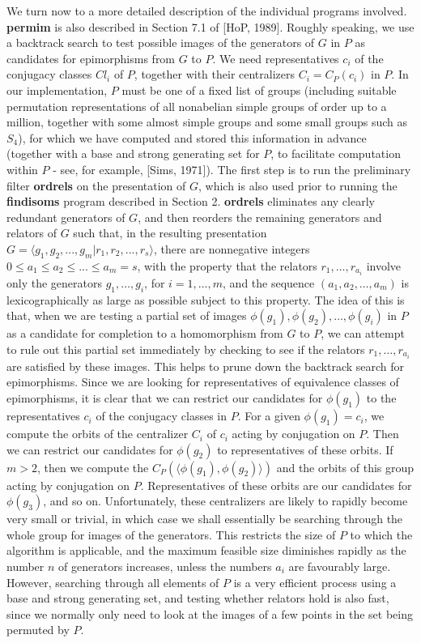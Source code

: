We turn now to a more detailed description of the individual programs
involved. {\bf permim} is also described in Section 7.1 of [HoP, 1989].
Roughly speaking, we use a backtrack search to test possible images of
the generators of $G$ in $P$ as candidates for epimorphisms from $G$ to $P$.
We need representatives  $c_i$ of the conjugacy classes $Cl_i$ of $P$,
together with their centralizers  $C_i = C_P(c_i)$ in $P$. In our
implementation, $P$ must be one of a fixed list of groups (including suitable
permutation representations of all nonabelian simple groups of order up to a
million, together with some almost simple groups and some small groups
such as $S_4$), for which we have computed
and stored this information in advance  (together with a base and strong
generating set  for $P$,  to facilitate computation within $P$ -
see, for example, [Sims, 1971]).
The first step is to run the preliminary filter {\bf ordrels} on the 
presentation
of $G$, which is also used prior to running the {\bf findisoms} program
described in Section 2.
{\bf ordrels} eliminates any clearly redundant generators of $G$, and then
reorders the remaining generators and relators of $G$ such that, in the
resulting presentation
$G = \langle g_1, g_2, ..., g_m | r_1, r_2, ..., r_s \rangle$,
there are nonnegative integers $0 \leq a_1 \leq a_2 \leq ... \leq a_m = s$,
with the property that the relators $r_1, \ldots , r_{a_i}$  involve only the
generators $g_1, \ldots , g_i$,  for $i = 1,\ldots ,m$,  and the sequence
$(a_1,a_2,\ldots ,a_m)$ is lexicographically as large as possible subject to
this property. The idea of this is that, when we are testing a partial
set of images  $\phi(g_1), \phi(g_2), \ldots , \phi(g_i)$ in $P$ as a candidate
for completion to a homomorphism from $G$ to $P$, we can attempt to rule out
this partial set immediately by checking to see if the relators
$r_1, \ldots , r_{a_i}$ are satisfied by these images. This helps to prune down
the backtrack search for epimorphisms. Since we are looking for representatives
of equivalence classes of epimorphisms, it is clear that we can restrict
our candidates for $\phi(g_1)$ to the representatives $c_i$ of the conjugacy
classes in $P$. For a given $\phi(g_1) = c_i$, we compute the orbits of the
centralizer  $C_i$ of $c_i$ acting by conjugation on $P$. Then we can restrict
our candidates for $\phi(g_2)$ to representatives of these orbits. If $m > 2$,
then we compute the  $C_P(\langle\phi(g_1),\phi(g_2)\rangle)$ and the orbits
of this group acting by conjugation on $P$.  Representatives of these orbits
are our candidates for  $\phi(g_3)$, and so on.  Unfortunately, these
centralizers are likely to rapidly become very small or trivial, in which case
we shall essentially be searching through the whole group for images of the
generators.  This restricts the size of  $P$ to which the algorithm is
applicable, and the maximum feasible size diminishes rapidly as the number  $n$ 
of generators increases, unless the numbers $a_i$ are favourably large.
However, searching through all elements of $P$ is a very efficient process
using a base and strong generating set, and testing whether relators hold is
also fast, since we normally only need to look at the images of a few points
in the set being permuted by $P$.

